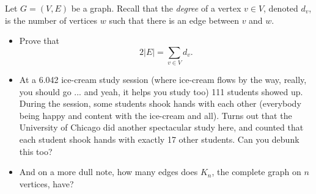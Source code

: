 \documentclass[twoside,12pt]{article}
\begin{document}
\begin{problem}
Let $G = (V,E)$ be a graph. Recall that the {\em degree} of a vertex $v \in V$, denoted $d_v$, is the number of vertices $w$ such that there is an edge between $v$ and $w$.
\begin{itemize}
\item Prove that $$2|E| = \sum_{v\in V} d_v.$$
\item At a 6.042 ice-cream study session (where ice-cream flows by the way, really, you should go ... and yeah, it helps you study too) 111 students showed up. During the session, some students shook hands with each other (everybody being happy and content with the ice-cream and all). Turns out that the University of Chicago did another spectacular study here, and counted that each student shook hands with exactly 17 other students. Can you debunk this too?
\item And on a more dull note, how many edges does $K_n$, the complete graph on $n$ vertices, have?
\end{itemize}


\end{problem}
\end{document}
